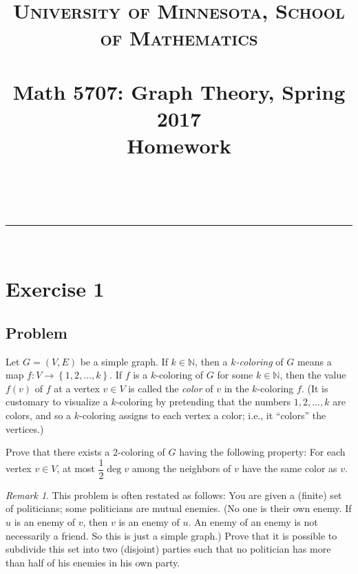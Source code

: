 \documentclass[paper=a4, fontsize=12pt]{scrartcl} %
\title{	
\normalfont \normalsize 
\textsc{University of Minnesota, School of Mathematics} \\ [25pt] %
\horrule{0.5pt} \\[0.4cm] %
\huge Math 5707: Graph Theory, Spring 2017\\
Homework \psetnumber\\%
\horrule{2pt} \\[0.5cm] %
}
\author{\myname}
\newcommand{\NN}{\mathbb{N}} %
\newcommand{\set}[1]{\left\{ #1 \right\}}
\newcommand{\tup}[1]{\left( #1 \right)}
\newcommand{\horrule}[1]{\rule{\linewidth}{#1}} %
\theoremstyle{plainsl}
\theoremstyle{definition}
\theoremstyle{remark}
\newtheorem{remark}[theorem]{Remark}
\begin{document}
\maketitle %

\horrule{0.3pt} \\[0.4cm]

\section{Exercise 1}

\subsection{Problem}

Let $G = \tup{V, E}$ be a simple graph.
If $k \in \NN$,
then a \textit{$k$-coloring} of $G$ means a map
$f : V \to \set{1, 2, \ldots, k}$.
If $f$ is a $k$-coloring of $G$ for some $k \in \NN$, then the value
$f \tup{v}$ of $f$ at a vertex $v \in V$ is called the
\textit{color} of $v$ in the $k$-coloring $f$.
(It is customary to visualize a $k$-coloring by pretending that the
numbers $1, 2, \ldots, k$ are colors, and so a $k$-coloring assigns to
each vertex a color; i.e., it ``colors'' the vertices.)

Prove that there exists a $2$-coloring of $G$ having the following
property: For each vertex $v \in V$, at most $\dfrac{1}{2} \deg v$
among the neighbors of $v$ have the same color as $v$.

\begin{remark} \label{rmk.exe1.r}
This problem is often restated as follows: You are given a (finite)
set of politicians; some politicians are mutual enemies. (No one is
their own enemy. If $u$ is an enemy of $v$, then $v$ is an enemy of
$u$. An enemy of an enemy is not necessarily a friend. So this is just
a simple graph.) Prove that it is possible to subdivide this set into
two (disjoint) parties such that no politician has more than half of
his enemies in his own party.
\end{remark}
\end{document}
